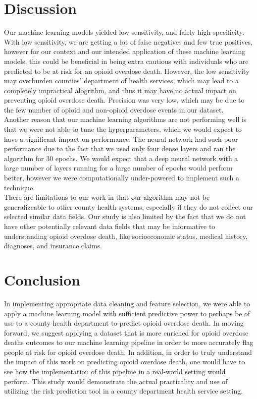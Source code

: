 \documentclass[twoside,10.5pt]{article}
\begin{document}
\section{Discussion}
Our machine learning models yielded low sensitivity, and fairly high specificity. With low sensitivity, we are getting a lot of false negatives and few true positives, however for our context and our intended application of these machine learning models, this could be beneficial in being extra cautious with individuals who are predicted to be at risk for an opioid overdose death. However, the low sensitivity may overburden counties' department of health services, which may lead to a completely impractical alogrithm, and thus it may have no actual impact on preventing opioid overdose death. Precision was very low, which may be due to the few number of opioid and non-opioid overdose events in our dataset.\\ 
Another reason that our machine learning algorithms are not performing well is that we were not able to tune the hyperparameters, which we would expect to have a significant impact on performance. The neural network had such poor performance due to the fact that we used only four dense layers and ran the algorithm for 30 epochs. We would expect that a deep neural network with a large number of layers running for a large number of epochs would perform better, however we were computationally under-powered to implement such a technique. \\
There are limitations to our work in that our algorithm may not be generalizeable to other county health systems, especially if they do not collect our selected similar data fields. Our study is also limited by the fact that we do not have other potentially relevant data fields that may be informative to understanding opioid overdose death, like socioeconomic status, medical history, diagnoses, and insurance claims. \\


\section{Conclusion}
In implementing appropriate data cleaning and feature selection, we were able to apply a machine learning model with sufficient predictive power to perhaps be of use to a county health department to predict opioid overdose death. In moving forward, we suggest applying a dataset that is more enriched for opioid overdose deaths outcomes to our machine learning pipeline in order to more accurately flag people at risk for opioid overdose death. In addition, in order to truly understand the impact of this work on predicting opioid overdose death, one would have to see how the implementation of this pipeline in a real-world setting would perform. This study would demonstrate the actual practicality and use of utilizing the risk prediction tool in a county department health service setting.\\
\end{document}
